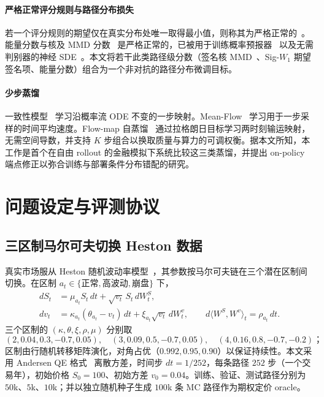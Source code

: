 \documentclass[11pt]{ctexart}
\begin{document}
\paragraph{严格正常评分规则与路径分布损失}
若一个评分规则的期望仅在真实分布处唯一取得最小值，则称其为严格正常的~\citep{gneiting2007strictly}。能量分数与核及 MMD 分数~\citep{gretton2012kernel} 是严格正常的，已被用于训练概率预报器~\citep{pacchiardi2024probabilistic} 以及无需判别器的神经 SDE~\citep{issa2023nonadversarial}。本文将若干此类路径级分数（签名核 MMD~\citep{salvi2021signature}、Sig-$W_1$ 期望签名项、能量分数）组合为一个非对抗的路径分布微调目标。

\paragraph{少步蒸馏}
一致性模型~\citep{song2023consistency,song2024improved} 学习沿概率流 ODE 不变的一步映射。Mean-Flow~\citep{geng2025meanflow} 学习用于一步采样的时间平均速度。Flow-map 自蒸馏~\citep{boffi2025flowmaps} 通过拉格朗日目标学习两时刻输运映射，无需空间导数，并支持 $K$ 步组合以换取质量与算力的可调权衡。据本文所知，本工作是首个在自由 rollout 的金融模拟下系统比较这三类蒸馏，并提出 on-policy 端点修正以弥合训练与部署条件分布错配的研究。

\section{问题设定与评测协议}
\label{sec:setup}

\subsection{三区制马尔可夫切换 Heston 数据}
真实市场服从 Heston 随机波动率模型~\citep{heston1993}，其参数按马尔可夫链在三个潜在区制间切换。在区制 $a_t\in\{\text{正常},\text{高波动},\text{崩盘}\}$ 下，
\begin{align}
dS_t &= \mu_{a_t} S_t\,dt + \sqrt{v_t}\,S_t\,dW^S_t, \\
dv_t &= \kappa_{a_t}(\theta_{a_t}-v_t)\,dt
      + \xi_{a_t}\sqrt{v_t}\,dW^v_t,\qquad
d\langle W^S,W^v\rangle_t = \rho_{a_t}\,dt .
\end{align}
三个区制的 $(\kappa,\theta,\xi,\rho,\mu)$ 分别取
\[
(2,0.04,0.3,-0.7,0.05),\quad (3,0.09,0.5,-0.7,0.05),\quad (4,0.16,0.8,-0.7,-0.2)\text{；}
\]
区制由行随机转移矩阵演化，对角占优（$0.992,0.95,0.90$）以保证持续性。本文采用 Andersen QE 格式~\citep{andersen2008simple} 离散方差，时间步 $dt=1/252$，每条路径 $252$ 步（一个交易年），初始价格 $S_0=100$、初始方差 $v_0=0.04$。训练、验证、测试路径分别为 $50$k、$5$k、$10$k；并以独立随机种子生成 $100$k 条 MC 路径作为期权定价 oracle。
\end{document}
